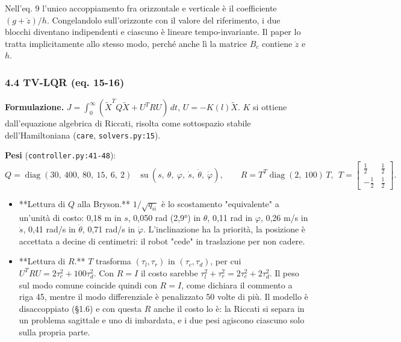 \documentclass[
]{article}
\providecommand{\tightlist}{%
  \setlength{\itemsep}{0pt}\setlength{\parskip}{0pt}}
\begin{document}
Nell'eq. 9 l'unico accoppiamento fra orizzontale e verticale è il coefficiente \((g+\ddot z)/h\). Congelandolo sull'orizzonte con il valore del riferimento, i due blocchi diventano indipendenti e ciascuno è lineare tempo-invariante. Il paper lo tratta implicitamente allo stesso modo, perché anche lì la matrice \(B_c\) contiene \(\ddot z\) e \(h\).

\subsubsection{4.4 TV-LQR (eq. 15-16)}\label{44-tv-lqr-eq-15-16}

\textbf{Formulazione.} \(J = \int_0^\infty(\tilde X^TQ\tilde X + U^TRU)\,dt\), \(U = -K(l)\tilde X\). \(K\) si ottiene dall'equazione algebrica di Riccati, risolta come sottospazio stabile dell'Hamiltoniana (\texttt{care}, \texttt{solvers.py:15}).

\textbf{Pesi} (\texttt{controller.py:41-48}): \[Q = \operatorname{diag}(30,\ 400,\ 80,\ 15,\ 6,\ 2)\quad\text{su}\ (s,\ \theta,\ \varphi,\ \dot s,\ \dot\theta,\ \dot\varphi),\qquad R = T^T\operatorname{diag}(2,\ 100)\,T,\ \ T = \begin{bmatrix}\tfrac12&\tfrac12\\-\tfrac12&\tfrac12\end{bmatrix}.\]

\begin{itemize}
\tightlist
\item **Lettura di \(Q\) alla Bryson.** \(1/\sqrt{q_{ii}}\) è lo scostamento "equivalente" a un'unità di costo: 0,18 m in \(s\), 0,050 rad (2,9°) in \(\theta\), 0,11 rad in \(\varphi\), 0,26 m/s in \(\dot s\), 0,41 rad/s in \(\dot\theta\), 0,71 rad/s in \(\dot\varphi\). L'inclinazione ha la priorità, la posizione è accettata a decine di centimetri: il robot "cede" in traslazione per non cadere.
\item **Lettura di \(R\).** \(T\) trasforma \((\tau_l, \tau_r)\) in \((\tau_c, \tau_d)\), per cui \(U^TRU = 2\tau_c^2 + 100\tau_d^2\). Con \(R = I\) il costo sarebbe \(\tau_l^2+\tau_r^2 = 2\tau_c^2 + 2\tau_d^2\). Il peso sul modo comune coincide quindi con \(R = I\), come dichiara il commento a riga 45, mentre il modo differenziale è penalizzato 50 volte di più. Il modello è disaccoppiato (§1.6) e con questa \(R\) anche il costo lo è: la Riccati si separa in un problema sagittale e uno di imbardata, e i due pesi agiscono ciascuno solo sulla propria parte.
\end{itemize}
\end{document}
